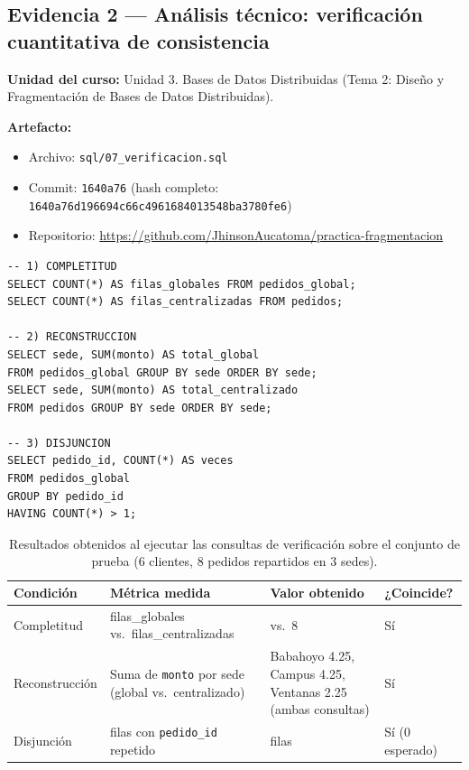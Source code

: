 \documentclass[11pt]{article}
\begin{document}
    \subsection{Evidencia 2 --- Análisis técnico: verificación cuantitativa de consistencia}

    \noindent\textbf{Unidad del curso:} Unidad 3. Bases de Datos Distribuidas (Tema 2: Diseño y Fragmentación de Bases de Datos Distribuidas).

    \noindent\textbf{Artefacto:}
    \begin{itemize}[noitemsep,topsep=2pt]
  \item Archivo: \texttt{sql/07\_verificacion.sql}
  \item Commit: \texttt{1640a76} (hash completo: \texttt{1640a76d196694c66c4961684013548ba3780fe6})
  \item Repositorio: \url{https://github.com/JhinsonAucatoma/practica-fragmentacion}
    \end{itemize}

    \begin{lstlisting}[caption={Consultas de \texttt{07\_verificacion.sql} usadas para medir completitud, reconstrucción y disjunción.}, label={lst:ev2-verificacion}]
-- 1) COMPLETITUD
SELECT COUNT(*) AS filas_globales FROM pedidos_global;
SELECT COUNT(*) AS filas_centralizadas FROM pedidos;

-- 2) RECONSTRUCCION
SELECT sede, SUM(monto) AS total_global
FROM pedidos_global GROUP BY sede ORDER BY sede;
SELECT sede, SUM(monto) AS total_centralizado
FROM pedidos GROUP BY sede ORDER BY sede;

-- 3) DISJUNCION
SELECT pedido_id, COUNT(*) AS veces
FROM pedidos_global
GROUP BY pedido_id
HAVING COUNT(*) > 1;
    \end{lstlisting}

    \begin{table}[H]
        \centering
        \caption{Resultados obtenidos al ejecutar las consultas de verificación sobre el conjunto de prueba (6 clientes, 8 pedidos repartidos en 3 sedes).}
        \label{tab:ev2-resultados}
        \small
        \begin{tabular}{@{}>{\raggedright\arraybackslash}p{2.6cm} >{\raggedright\arraybackslash}p{4.0cm} >{\raggedright\arraybackslash}p{5.6cm} >{\raggedright\arraybackslash}p{1.8cm}@{}}
            \toprule
            Condición & Métrica medida & Valor obtenido & ¿Coincide? \\
            \midrule
            Completitud & filas\_globales vs.\ filas\_centralizadas & 8 vs.\ 8 & Sí \\
            Reconstrucción & Suma de \texttt{monto} por sede (global vs.\ centralizado) & Babahoyo 4.25, Campus 4.25, Ventanas 2.25 (ambas consultas) & Sí \\
            Disjunción & filas con \texttt{pedido\_id} repetido & 0 filas & Sí (0 esperado) \\
            \bottomrule
        \end{tabular}
    \end{table}
\end{document}
